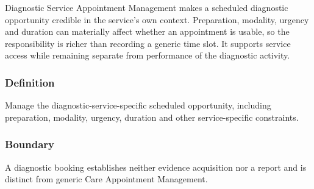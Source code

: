 Diagnostic Service Appointment Management makes a scheduled diagnostic opportunity credible in the service's own context. Preparation, modality, urgency and duration can materially affect whether an appointment is usable, so the responsibility is richer than recording a generic time slot. It supports service access while remaining separate from performance of the diagnostic activity.

\subsubsection*{Definition}

Manage the diagnostic-service-specific scheduled opportunity, including preparation, modality, urgency, duration and other service-specific constraints.

\subsubsection*{Boundary}

A diagnostic booking establishes neither evidence acquisition nor a report and is distinct from generic Care Appointment Management.

